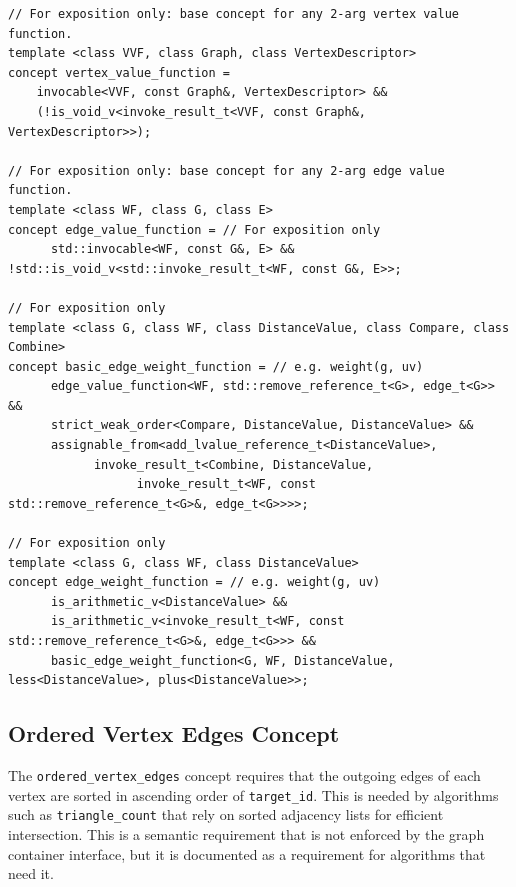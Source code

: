 \begin{lstlisting}
// For exposition only: base concept for any 2-arg vertex value function.
template <class VVF, class Graph, class VertexDescriptor>
concept vertex_value_function =
    invocable<VVF, const Graph&, VertexDescriptor> &&
    (!is_void_v<invoke_result_t<VVF, const Graph&, VertexDescriptor>>);

// For exposition only: base concept for any 2-arg edge value function.
template <class WF, class G, class E>
concept edge_value_function = // For exposition only
      std::invocable<WF, const G&, E> && !std::is_void_v<std::invoke_result_t<WF, const G&, E>>;

// For exposition only
template <class G, class WF, class DistanceValue, class Compare, class Combine>
concept basic_edge_weight_function = // e.g. weight(g, uv)
      edge_value_function<WF, std::remove_reference_t<G>, edge_t<G>> &&
      strict_weak_order<Compare, DistanceValue, DistanceValue> &&
      assignable_from<add_lvalue_reference_t<DistanceValue>,
            invoke_result_t<Combine, DistanceValue,
                  invoke_result_t<WF, const std::remove_reference_t<G>&, edge_t<G>>>>;

// For exposition only
template <class G, class WF, class DistanceValue>
concept edge_weight_function = // e.g. weight(g, uv)
      is_arithmetic_v<DistanceValue> &&
      is_arithmetic_v<invoke_result_t<WF, const std::remove_reference_t<G>&, edge_t<G>>> &&
      basic_edge_weight_function<G, WF, DistanceValue, less<DistanceValue>, plus<DistanceValue>>;
\end{lstlisting}

\subsection{Ordered Vertex Edges Concept}
The \lstinline{ordered_vertex_edges} concept requires that the outgoing edges of each vertex
are sorted in ascending order of \lstinline{target_id}. This is needed by algorithms such as
\lstinline{triangle_count} that rely on sorted adjacency lists for efficient intersection.
This is a semantic requirement that is not enforced by the graph container interface, but it 
is documented as a requirement for algorithms that need it.

